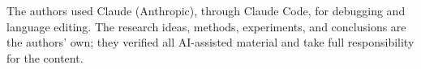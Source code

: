 \documentclass[conference]{IEEEtran}
\begin{document}


The authors used Claude (Anthropic), through Claude Code, for debugging and language editing. The research ideas, methods, experiments, and conclusions are the authors' own; they verified all AI-assisted material and take full responsibility for the content.



\end{document}
